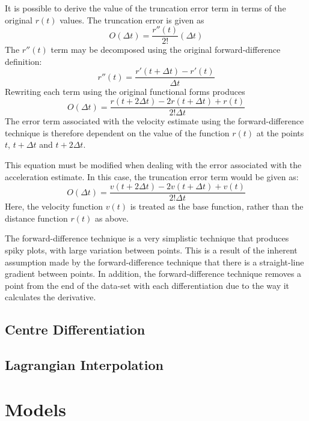 \documentclass[namedreferences]{SolarPhysics}
\begin{document}
\begin{article}
It is possible to derive the value of the truncation error term in terms of the original $r(t)$ values. The truncation error is given as
\begin{equation}
O(\Delta t) = \frac{r''(t)}{2!}(\Delta t)
\end{equation}
The $r''(t)$ term may be decomposed using the original forward-difference definition:
\begin{equation}
r''(t) = \frac{r'(t + \Delta t) - r'(t)}{\Delta t}
\end{equation}
Rewriting each term using the original functional forms produces
\begin{equation}
O(\Delta t) = \frac{r(t + 2\Delta t) - 2r(t + \Delta t) + r(t)}{2!\Delta t}
\end{equation}
The error term associated with the velocity estimate using the forward-difference technique is therefore dependent on the value of the function $r(t)$ at the points $t$, $t+\Delta t$ and $t+2\Delta t$.

This equation must be modified when dealing with the error associated with the acceleration estimate. In this case, the truncation error term would be given as:
\begin{equation}
O(\Delta t) = \frac{v(t + 2\Delta t) - 2v(t + \Delta t) + v(t)}{2!\Delta t}
\end{equation}
Here, the velocity function $v(t)$ is treated as the base function, rather than the distance function $r(t)$ as above. 

The forward-difference technique is a very simplistic technique that produces spiky plots, with large variation between points. This is a result of the inherent assumption made by the forward-difference technique that there is a straight-line gradient between points. In addition, the forward-difference technique removes a point from the end of the data-set with each differentiation due to the way it calculates the derivative.


\subsection{Centre Differentiation}

\subsection{Lagrangian Interpolation}



    
\section{Models} %
      \label{S-features}      


\end{article}
\end{document}
